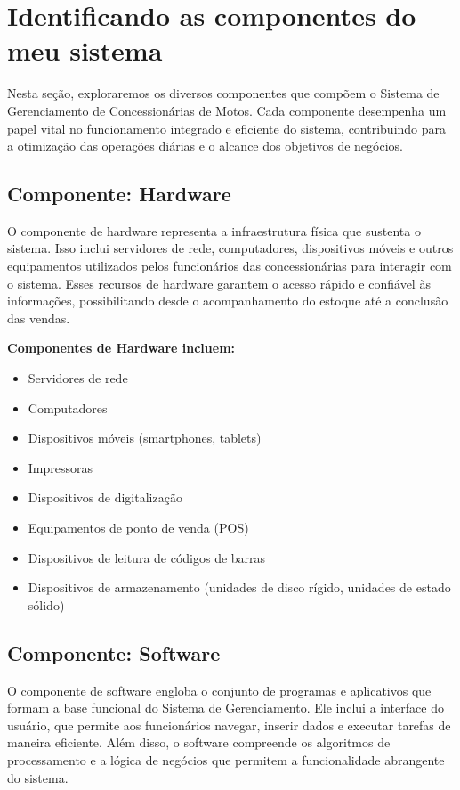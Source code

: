  \section{Identificando as componentes do meu sistema}

	Nesta seção, exploraremos os diversos componentes que compõem o Sistema de Gerenciamento de Concessionárias de Motos. Cada componente desempenha um papel vital no funcionamento integrado e eficiente do sistema, contribuindo para a otimização das operações diárias e o alcance dos objetivos de negócios.
     \subsection{Componente: Hardware}
	O componente de hardware representa a infraestrutura física que sustenta o sistema. Isso inclui servidores de rede, computadores, dispositivos móveis e outros equipamentos utilizados pelos funcionários das concessionárias para interagir com o sistema. Esses recursos de hardware garantem o acesso rápido e confiável às informações, possibilitando desde o acompanhamento do estoque até a conclusão das vendas.
	
	\textbf{Componentes de Hardware incluem:}
	
	\begin{itemize}
		\item Servidores de rede
		\item Computadores
		\item Dispositivos móveis (smartphones, tablets)
		\item Impressoras
		\item Dispositivos de digitalização
		\item Equipamentos de ponto de venda (POS)
		\item Dispositivos de leitura de códigos de barras
		\item Dispositivos de armazenamento (unidades de disco rígido, unidades de estado sólido)
	\end{itemize}
	
	
     \subsection{Componente: Software}
     
     O componente de software engloba o conjunto de programas e aplicativos que formam a base funcional do Sistema de Gerenciamento. Ele inclui a interface do usuário, que permite aos funcionários navegar, inserir dados e executar tarefas de maneira eficiente. Além disso, o software compreende os algoritmos de processamento e a lógica de negócios que permitem a funcionalidade abrangente do sistema.
     
